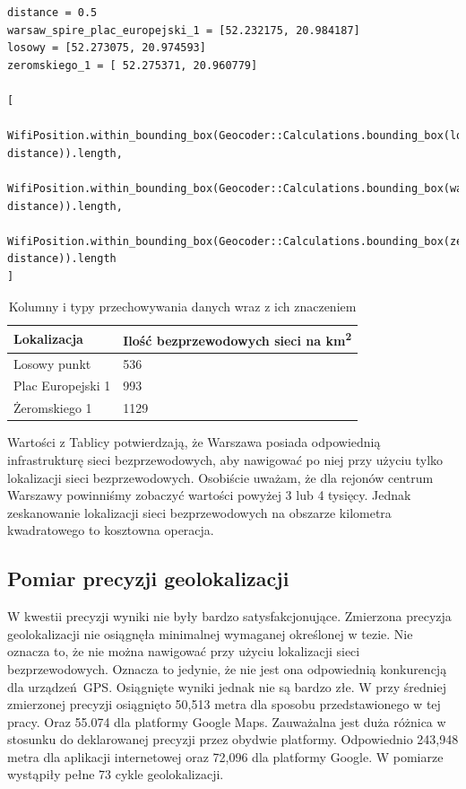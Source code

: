 \begin{verbatim}
distance = 0.5
warsaw_spire_plac_europejski_1 = [52.232175, 20.984187]
losowy = [52.273075, 20.974593]
zeromskiego_1 = [ 52.275371, 20.960779]

[
  WifiPosition.within_bounding_box(Geocoder::Calculations.bounding_box(losowy, distance)).length,
  WifiPosition.within_bounding_box(Geocoder::Calculations.bounding_box(warsaw_spire_plac_europejski_1, distance)).length,
  WifiPosition.within_bounding_box(Geocoder::Calculations.bounding_box(zeromskiego_1, distance)).length
]
\end{verbatim}

\begin{table}
\caption{Kolumny i typy przechowywania danych wraz z ich znaczeniem}
\label{table:density_result}
\begin{tabular} { |l|l|  }
\hline
Lokalizacja & Ilość bezprzewodowych sieci na km\textsuperscript{2} \\
\hline
\hline
Losowy punkt & 536 \\
Plac Europejski 1 & 993 \\
Żeromskiego 1 & 1129 \\
\hline
\end{tabular}
\end{table}

Wartości z Tablicy  potwierdzają, że Warszawa posiada odpowiednią infrastrukturę sieci bezprzewodowych, aby nawigować po niej przy użyciu tylko lokalizacji sieci bezprzewodowych. Osobiście uważam, że dla rejonów centrum Warszawy powinniśmy zobaczyć wartości powyżej 3 lub 4 tysięcy. Jednak zeskanowanie lokalizacji sieci bezprzewodowych na obszarze kilometra kwadratowego to kosztowna operacja.

\subsection{Pomiar precyzji geolokalizacji}
W kwestii precyzji wyniki nie były bardzo satysfakcjonujące. Zmierzona precyzja geolokalizacji nie osiągnęła minimalnej wymaganej określonej w tezie. Nie oznacza to, że nie można nawigować przy użyciu lokalizacji sieci bezprzewodowych. Oznacza to jedynie, że nie jest ona odpowiednią konkurencją dla urządzeń GPS. Osiągnięte wyniki jednak nie są bardzo złe. W przy średniej zmierzonej precyzji osiągnięto 50,513 metra dla sposobu przedstawionego w tej pracy. Oraz 55.074 dla platformy Google Maps. Zauważalna jest duża różnica w stosunku do deklarowanej precyzji przez obydwie platformy. Odpowiednio 243,948 metra dla aplikacji internetowej oraz 72,096 dla platformy Google. W pomiarze wystąpiły pełne 73 cykle geolokalizacji.

